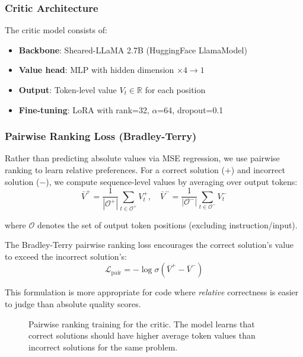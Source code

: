 \subsubsection{Critic Architecture}

The critic model consists of:
\begin{itemize}[nosep]
    \item \textbf{Backbone}: Sheared-LLaMA 2.7B (HuggingFace LlamaModel)
    \item \textbf{Value head}: MLP with hidden dimension $\times 4 \rightarrow 1$
    \item \textbf{Output}: Token-level value $V_t \in \mathbb{R}$ for each position
    \item \textbf{Fine-tuning}: LoRA with rank=32, $\alpha$=64, dropout=0.1
\end{itemize}

\subsubsection{Pairwise Ranking Loss (Bradley-Terry)}

Rather than predicting absolute values via MSE regression, we use pairwise ranking to learn relative preferences. For a correct solution ($+$) and incorrect solution ($-$), we compute sequence-level values by averaging over output tokens:
\begin{equation}
    \bar{V}^{+} = \frac{1}{|\mathcal{O}^{+}|} \sum_{t \in \mathcal{O}^{+}} V_t^{+}, \quad
    \bar{V}^{-} = \frac{1}{|\mathcal{O}^{-}|} \sum_{t \in \mathcal{O}^{-}} V_t^{-}
\end{equation}

where $\mathcal{O}$ denotes the set of output token positions (excluding instruction/input).

The Bradley-Terry pairwise ranking loss encourages the correct solution's value to exceed the incorrect solution's:
\begin{equation}
    \mathcal{L}_{\text{pair}} = -\log \sigma(\bar{V}^{+} - \bar{V}^{-})
    \label{eq:pairwise_loss}
\end{equation}

This formulation is more appropriate for code where \textit{relative} correctness is easier to judge than absolute quality scores.

\begin{figure}[h]
    \centering
    \caption{Pairwise ranking training for the critic. The model learns that correct solutions should have higher average token values than incorrect solutions for the same problem.}
    \label{fig:pairwise}
\end{figure}

